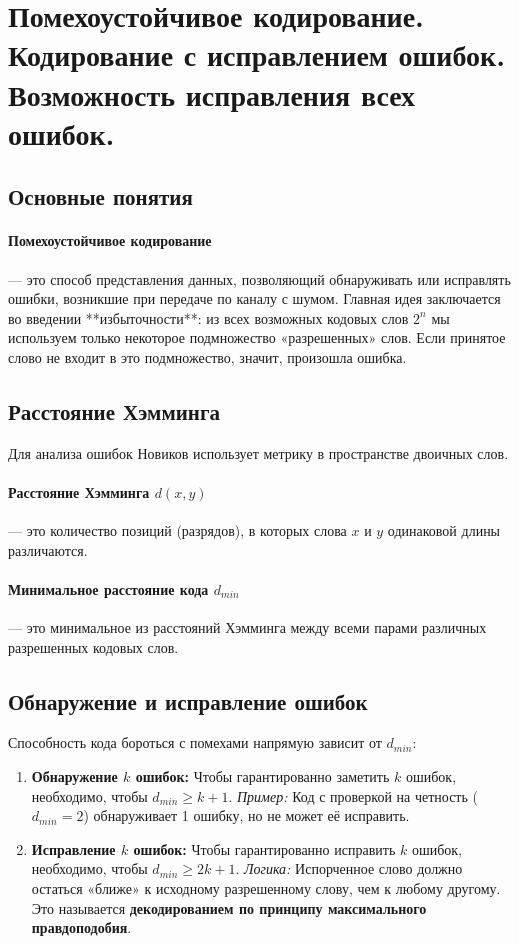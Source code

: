 \section{Помехоустойчивое кодирование. Кодирование с исправлением ошибок. Возможность исправления всех ошибок.}

\subsection*{Основные понятия}

\paragraph{Помехоустойчивое кодирование} — это способ представления данных, позволяющий обнаруживать или исправлять ошибки, возникшие при передаче по каналу с шумом.
Главная идея заключается во введении **избыточности**: из всех возможных кодовых слов $2^n$ мы используем только некоторое подмножество «разрешенных» слов. Если принятое слово не входит в это подмножество, значит, произошла ошибка.

\subsection*{Расстояние Хэмминга}

Для анализа ошибок Новиков использует метрику в пространстве двоичных слов.
\paragraph{Расстояние Хэмминга $d(x, y)$} — это количество позиций (разрядов), в которых слова $x$ и $y$ одинаковой длины различаются.
\paragraph{Минимальное расстояние кода $d_{min}$} — это минимальное из расстояний Хэмминга между всеми парами различных разрешенных кодовых слов.

\subsection*{Обнаружение и исправление ошибок}

Способность кода бороться с помехами напрямую зависит от $d_{min}$:

\begin{enumerate}
    \item \textbf{Обнаружение $k$ ошибок:} 
    Чтобы гарантированно заметить $k$ ошибок, необходимо, чтобы $d_{min} \ge k + 1$. 
    \textit{Пример:} Код с проверкой на четность ($d_{min}=2$) обнаруживает 1 ошибку, но не может её исправить.
    
    \item \textbf{Исправление $k$ ошибок:} 
    Чтобы гарантированно исправить $k$ ошибок, необходимо, чтобы $d_{min} \ge 2k + 1$.
    \textit{Логика:} Испорченное слово должно остаться «ближе» к исходному разрешенному слову, чем к любому другому. Это называется \textbf{декодированием по принципу максимального правдоподобия}.
\end{enumerate}

